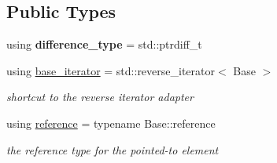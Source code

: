 \subsection*{Public Types}
\begin{DoxyCompactItemize}
\item 
using {\bfseries difference\+\_\+type} = std\+::ptrdiff\+\_\+t\hypertarget{classnlohmann_1_1detail_1_1json__reverse__iterator_a9ab55987c05ec6427ad36082e351cc45}{}\label{classnlohmann_1_1detail_1_1json__reverse__iterator_a9ab55987c05ec6427ad36082e351cc45}

\item 
using \hyperlink{classnlohmann_1_1detail_1_1json__reverse__iterator_a6b2ef1d632fe49bfcc22fbd1abd62395}{base\+\_\+iterator} = std\+::reverse\+\_\+iterator$<$ Base $>$\hypertarget{classnlohmann_1_1detail_1_1json__reverse__iterator_a6b2ef1d632fe49bfcc22fbd1abd62395}{}\label{classnlohmann_1_1detail_1_1json__reverse__iterator_a6b2ef1d632fe49bfcc22fbd1abd62395}

\begin{DoxyCompactList}\small\item\em shortcut to the reverse iterator adapter \end{DoxyCompactList}\item 
using \hyperlink{classnlohmann_1_1detail_1_1json__reverse__iterator_a42f51a69bac7b2aebb613b2164e457f1}{reference} = typename Base\+::reference\hypertarget{classnlohmann_1_1detail_1_1json__reverse__iterator_a42f51a69bac7b2aebb613b2164e457f1}{}\label{classnlohmann_1_1detail_1_1json__reverse__iterator_a42f51a69bac7b2aebb613b2164e457f1}

\begin{DoxyCompactList}\small\item\em the reference type for the pointed-\/to element \end{DoxyCompactList}\end{DoxyCompactItemize}
